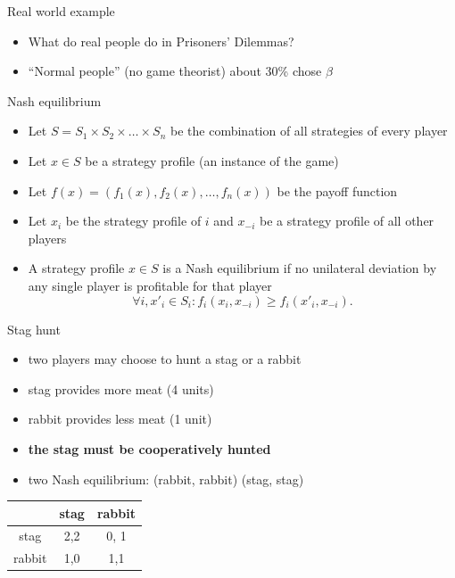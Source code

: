 \documentclass{beamer}
\begin{document}
\begin{frame}{Real world example}
  \begin{itemize}
  \item What do real people do in Prisoners' Dilemmas?
  \item ``Normal people'' (no game theorist) about 30\% chose $\beta$
  \end{itemize}
\end{frame}

\begin{frame}{Nash equilibrium}
  \begin{itemize}
  \item Let $S = S_1 \times S_2 \times \dots \times S_n$ be the
    combination of all strategies of every player
  \item<2-> Let $x \in S$ be a strategy profile (an instance of the game)
  \item<3-> Let $f(x) = (f_1(x), f_2(x), \dots, f_n(x))$ be the payoff
    function
  \item<4-> Let $x_i$ be the strategy profile of $i$ and $x_{-i}$ be a
    strategy profile of all other players
  \item<5-> A strategy profile $x \in S$ is a Nash equilibrium
    if no unilateral deviation by any single player is profitable for
    that player
\[
  \forall i,x'_i\in S_i :  f_i(x_{i}, x_{-i}) \geq f_i(x'_{i},x_{-i}).
\]

  \end{itemize}
\end{frame}

\begin{frame}[t]{Stag hunt}
  \begin{itemize}
    \item two players may choose to hunt a stag or a rabbit
    \item stag provides more meat (4 units)
    \item rabbit provides less meat (1 unit)
    \item<2-> \textbf{the stag must be cooperatively hunted}
    \item<4-> two Nash equilibrium: (rabbit, rabbit) (stag, stag)
  \end{itemize}
   {
\begin{center}
  \begin{tabular}{|c|c|c|}
    \hline
     & stag & rabbit  \\
    \hline
stag
     & 2,2 & 0, 1 \\
    \hline
rabbit
     & 1,0 & 1,1 \\
    \hline
  \end{tabular}
\end{center}
}
\end{frame}
\end{document}
